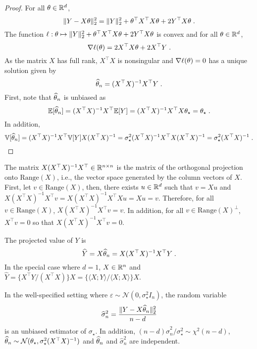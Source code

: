 \begin{proof}
For all $\theta\in\mathbb{R}^d$,
\[
 \|Y - X\theta\|_2^2 = \|Y\|_2^2 + \theta^\top X^\top X\theta + 2Y^\top X\theta\;.
\]
The function $\ell:\theta \mapsto\|Y\|_2^2 + \theta^\top X^\top X\theta + 2Y^\top X\theta$ is convex and for all $\theta\in\mathbb{R}^d$,
\[
\nabla \ell (\theta) = 2X^\top X\theta + 2 X^\top Y\;.
\]
As the matrix  $X$ has full rank, $X^\top X$ is nonsingular and $\nabla \ell (\theta) =0$ has a unique solution given by
\[
\widehat {\theta}_n = (X^\top X)^{-1}X^\top Y\;.
\]
First, note that $\widehat {\theta}_n$ is unbiased as
\[
\mathbb{E}[\widehat {\theta}_n] = (X^\top X)^{-1}X^\top \mathbb{E}[Y] = (X^\top X)^{-1}X^\top X\theta_{\star} = \theta_\star\;.
\]
In addition,
\[
\mathbb{V}[\widehat {\theta}_n] = (X^\top X)^{-1}X^\top\mathbb{V}[Y]X(X^\top X)^{-1}= \sigma_\star^2(X^\top X)^{-1}X^\top X(X^\top X)^{-1} = \sigma_\star^2(X^\top X)^{-1}\;.
\]
\end{proof}

\begin{remark}
\label{reg:linear:projX}
The matrix $X(X^\top X)^{-1}X^\top \in\mathbb{R}^{n\times n}$ is the matrix of the orthogonal projection onto $\mathrm{Range}(X)$, i.e., the vector space generated by the column vectors of $X$. First, let $v \in \mathrm{Range}(X)$, then, there exists $u\in\mathbb{R}^d$ such that $v = Xu$ and $X(X^\top X)^{-1}X^\top v = X(X^\top X)^{-1}X^\top Xu = Xu = v$. Therefore, for all $v \in \mathrm{Range}(X)$, $X(X^\top X)^{-1}X^\top v=v$. In addition, for all $v\in \mathrm{Range}(X)^\perp$, $X^\top v = 0$ so that $X(X^\top X)^{-1}X^\top v = 0$. 
\end{remark}

\begin{remark}
\label{reg:linear:projX:d1}
The projected value of $Y$ is 
$$
\widehat Y = X \widehat {\theta}_n = X(X^\top X)^{-1}X^\top Y\;.
$$
In the special case where $d = 1$, $X\in\mathbb{R}^n$ and $\widehat Y = \{X^\top Y/(X^\top X)\}X = \{\langle X ; Y\rangle / \langle X ; X \rangle\}X $.
\end{remark}

\begin{shaded}
\begin{proposition}
\label{prop:least:squares:full:rank:variance}
In the well-specified setting where $\varepsilon \sim \mathcal{N}(0,\sigma_\star^2I_n)$, the random variable
\[
\widehat \sigma^2_n =\frac{\|Y - X\widehat {\theta}_n \|_2^2}{n-d}
\]
is an unbiased estimator of $\sigma_\star$. In addition, $(n-d)\widehat \sigma^2_n/\sigma_\star^2\sim\chi^2(n-d)$, $\widehat {\theta}_n \sim \mathcal{N}(\theta_{\star},\sigma_\star^2(X^\top X)^{-1})$ and $\widehat {\theta}_n$ and $\widehat \sigma^2_n$ are independent.
\end{proposition}
\end{shaded}

